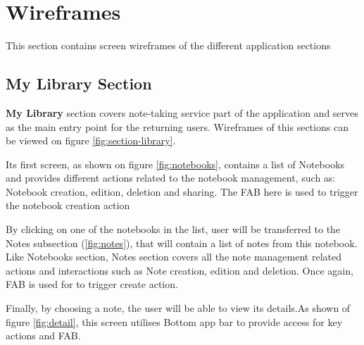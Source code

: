\documentclass[thesis=B,english]{FITthesis}[2012/10/20]
\begin{document}
\section{Wireframes}

This section contains screen wireframes of the different application sections

\subsection{My Library Section}

\textbf{My Library} section covers note-taking service part of the application and serves as the main entry point for the returning users. Wireframes of this sections can be viewed on figure \ref{fig:section-library}.
	
	Its first screen, as shown on figure \ref{fig:notebooks}, contains a list of Notebooks and provides different actions related to the notebook management, such as: Notebook creation, edition, deletion and sharing. The FAB here is used to trigger the notebook creation action
	
	By clicking on one of the notebooks in the list, user will be transferred to the Notes subsection (\ref{fig:notes}), that will contain a list of notes from this notebook. Like Notebooks section, Notes section covers all the note management related actions and interactions such as Note creation, edition and deletion. Once again, FAB is used for to trigger create action. 
	
	Finally, by choosing a note, the user will be able to view its details.As shown of figure \ref{fig:detail}, this screen utilises Bottom app bar to provide access for key actions and FAB.
	
\end{document}
